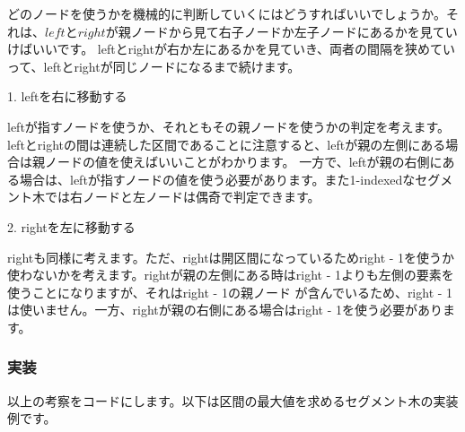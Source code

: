 \vspace{1cm}

どのノードを使うかを機械的に判断していくにはどうすればいいでしょうか。それは、$left$と$right$が親ノードから見て右子ノードか左子ノードにあるかを見ていけばいいです。
leftとrightが右か左にあるかを見ていき、両者の間隔を狭めていって、leftとrightが同じノードになるまで続けます。

1. leftを右に移動する

leftが指すノードを使うか、それともその親ノードを使うかの判定を考えます。leftとrightの間は連続した区間であることに注意すると、leftが親の左側にある場合は親ノードの値を使えばいいことがわかります。
一方で、leftが親の右側にある場合は、leftが指すノードの値を使う必要があります。また1-indexedなセグメント木では右ノードと左ノードは偶奇で判定できます。

2. rightを左に移動する

rightも同様に考えます。ただ、rightは開区間になっているためright - 1を使うか使わないかを考えます。rightが親の左側にある時はright - 1よりも左側の要素を使うことになりますが、それはright - 1の親ノード
が含んでいるため、right - 1は使いません。一方、rightが親の右側にある場合はright - 1を使う必要があります。

\subsubsection{実装}

以上の考察をコードにします。以下は区間の最大値を求めるセグメント木の実装例です。


